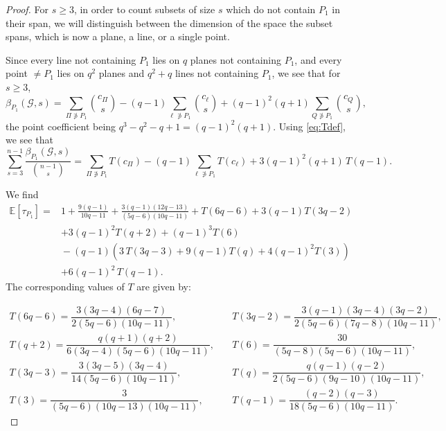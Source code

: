 \documentclass{article}
\newcommand{\Gscr}{\mathscr{G}}
\newcommand{\E}{\mathbb{E}}
\begin{document}
\begin{proof}
For $s\geq 3$, in order to count subsets of size $s$ which do not contain $P_1$ in their span, we
will distinguish between the dimension of the space the subset spans, which is now a plane, a
line, or a single point.

Since every line not containing $P_1$ lies on $q$ planes not containing $P_1$, and every point
$\ne P_1$ lies on $q^2$ planes and $q^2+q$ lines not containing $P_1$, we see that for $s\geq 3$,
\[
\beta_{P_1}(\Gscr,s)
=\sum_{\Pi\not\ni P_1}\binom{c_\Pi}{s}
-(q-1)\sum_{\ell\not\ni P_1}\binom{c_\ell}{s}
+(q-1)^2(q+1)\sum_{Q\not\ni P_1}\binom{c_Q}{s},
\]
the point coefficient being $q^3-q^2-q+1=(q-1)^2(q+1)$. Using \eqref{eq:Tdef}, we see that
\[
\sum_{s=3}^{n-1}\frac{\beta_{P_1}(\Gscr,s)}{\binom{n-1}{s}}
=\sum_{\Pi\not\ni P_1}T(c_\Pi)-(q-1)\sum_{\ell\not\ni P_1}T(c_\ell)
+3(q-1)^2(q+1)\,T(q-1).
\]

We find
\[
\begin{aligned}
\E[\tau_{P_1}]
={}&1+\frac{9(q-1)}{10q-11}+\frac{3(q-1)(12q-13)}{(5q-6)(10q-11)}+T(6q-6)+3(q-1)T(3q-2)\\&+3(q-1)^2T(q+2)+(q-1)^3T(6)\\
&{}-(q-1)\left(3\,T(3q-3)+9(q-1)T(q)+4(q-1)^2T(3)\right)\\
&+6(q-1)^2\,T(q-1).
\end{aligned}
\]
The corresponding values of $T$ are given by:

\[
\begin{array}{ll}
T(6q-6)=\dfrac{3(3q-4)(6q-7)}{2(5q-6)(10q-11)},
   & \quad
T(3q-2)=\dfrac{3(q-1)(3q-4)(3q-2)}{2(5q-6)(7q-8)(10q-11)},\\[2ex]
T(q+2)=\dfrac{q(q+1)(q+2)}{6(3q-4)(5q-6)(10q-11)},
   & \quad
T(6)=\dfrac{30}{(5q-8)(5q-6)(10q-11)},\\[2ex]
T(3q-3)=\dfrac{3(3q-5)(3q-4)}{14(5q-6)(10q-11)},
   & \quad
T(q)=\dfrac{q(q-1)(q-2)}{2(5q-6)(9q-10)(10q-11)},\\[2ex]
T(3)=\dfrac{3}{(5q-6)(10q-13)(10q-11)},
   & \quad
T(q-1)=\dfrac{(q-2)(q-3)}{18(5q-6)(10q-11)}.
\end{array}
\]


\end{proof}
\end{document}
